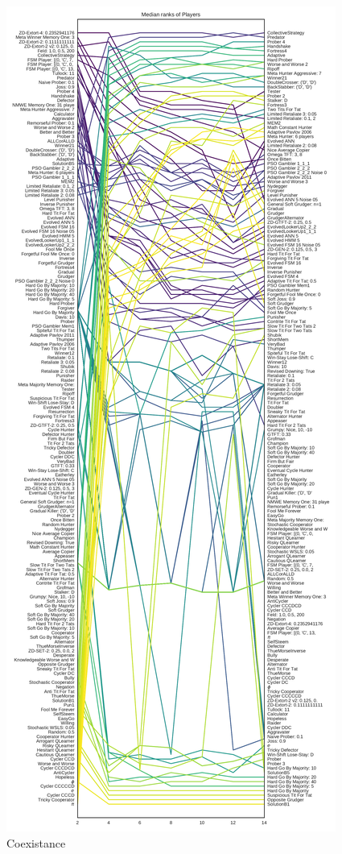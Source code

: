 \documentclass{article}
\begin{document}
\begin{figure}[!hbtp]
    \centering
    \includegraphics[height=.9\textheight]{../img/median_rank_vs_population_size_coexist.pdf}
    \caption{Coexistance}
    \label{fig:ranks_v_size_coexist}
\end{figure}
\end{document}
